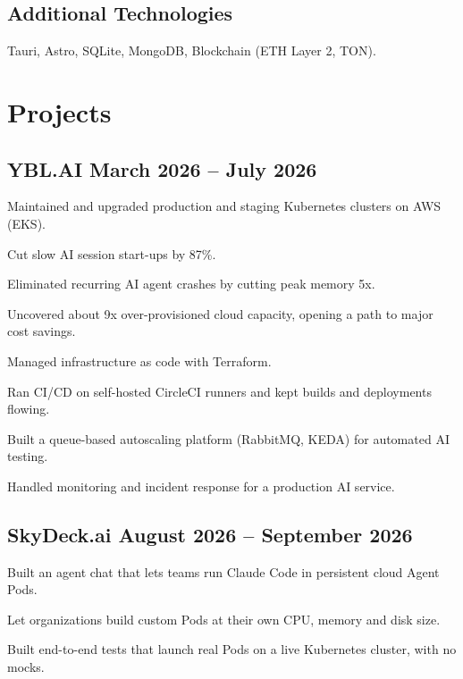 \subsection{{Additional Technologies}}
\begin{zitemize}
\item Tauri, Astro, SQLite, MongoDB, Blockchain (ETH Layer 2, TON).
\end{zitemize}

\section{Projects}

\subsection{{YBL.AI \hfill March 2026 -- July 2026}}
\begin{zitemize}
\item Maintained and upgraded production and staging Kubernetes clusters on AWS (EKS).
\item Cut slow AI session start-ups by 87\%.
\item Eliminated recurring AI agent crashes by cutting peak memory 5x.
\item Uncovered about 9x over-provisioned cloud capacity, opening a path to major cost savings.
\item Managed infrastructure as code with Terraform.
\item Ran CI/CD on self-hosted CircleCI runners and kept builds and deployments flowing.
\item Built a queue-based autoscaling platform (RabbitMQ, KEDA) for automated AI testing.
\item Handled monitoring and incident response for a production AI service.
\end{zitemize}

\subsection{{SkyDeck.ai \hfill August 2026 -- September 2026}}
\begin{zitemize}
\item Built an agent chat that lets teams run Claude Code in persistent cloud Agent Pods.
\item Let organizations build custom Pods at their own CPU, memory and disk size.
\item Built end-to-end tests that launch real Pods on a live Kubernetes cluster, with no mocks.
\end{zitemize}

